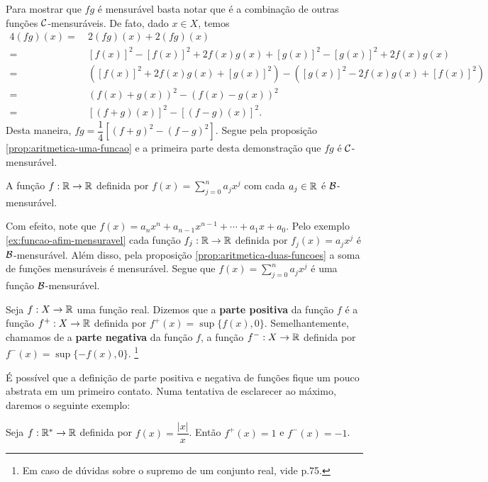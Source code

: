 \begin{prova}
    Para mostrar que $fg$ é mensurável basta notar que é a combinação de outras funções $\operatorname{\mathcal{C}}$-mensuráveis.
    De fato, dado $x \in X$, temos
	    \begin{align*}
	        4(fg)(x) 
	        =& \ 2(fg)(x) +  2(fg)(x)\\
	        =& \ [f(x)]^2 - [f(x)]^2 + 2f(x)g(x) + [g(x)]^2 - [g(x)]^2 + 2f(x)g(x)\\
	        =& \ \left([f(x)]^2 + 2f(x)g(x) + [g(x)]^2\right)  - \left([g(x)]^2 - 2f(x)g(x) + [f(x)]^2\right)\\
	        =& \ (f(x) +g(x))^2 - (f(x) - g(x))^2\\
	        =& \ [(f+g)(x)]^2 - [(f-g)(x)]^2.
	    \end{align*}
    Desta maneira, $fg = \dfrac{1}{4}\left[(f+g)^2 - (f-g)^2\right]$. Segue pela proposição \ref{prop:aritmetica-uma-funcao} e a primeira parte desta demonstração que $fg$ é $\operatorname{\mathcal{C}}$-mensurável.
\end{prova}

\begin{example}
\label{ex:funcao-polinomial-mensuravel}
    A função  $f:\mathbb{R} \to \mathbb{R}$ definida por $f(x) = \displaystyle \sum_{j = 0}^n a_jx^j$ com cada $a_j \in \mathbb{R}$ é $\operatorname{\mathcal{B}}$-mensurável.
\end{example}
   
    Com efeito, note que  $f(x) = a_nx^n + a_{n-1}x^{n-1} + \cdots + a_1x +a_0$.
	Pelo exemplo \ref{ex:funcao-afim-mensuravel} cada função $f_j:\mathbb{R} \to \mathbb{R}$ definida por  $f_j(x) = a_jx^j$ é $\operatorname{\mathcal{B}}$-mensurável.
	Além disso, pela proposição \ref{prop:aritmetica-duas-funcoes} a soma de funções mensuráveis é mensurável.
	Segue que $f(x) = \displaystyle\sum_{j = 0}^n a_jx^j$ é uma função $\operatorname{\mathcal{B}}$-mensurável.

\begin{definition}
	\label{def:parte-positiva e negativa}
    Seja $f: X \to \mathbb{R}$ uma função real. Dizemos que a \textbf{parte positiva} da função $f$ é a função $f^+: X \to \mathbb{R}$ definida por $f^+(x) = \sup\{f(x), 0\}$.
    Semelhantemente, chamamos de a \textbf{parte negativa} da função $f$, a função $f^-: X \to \mathbb{R}$ definida por $f^-(x) = \sup\{-f(x), 0\}$.
    \footnote{Em caso de dúvidas sobre o supremo de um conjunto real, vide \supercite{elon}{p.75}.}
\end{definition}

É possível  que a definição de parte positiva e negativa de funções fique um pouco abstrata em um primeiro contato. 
Numa tentativa de esclarecer ao máximo, daremos o seguinte exemplo:
\begin{example}
    Seja $f: \mathbb{R}^* \to \mathbb{R}$ definida por $f(x) =\dfrac{|x|}{x}$. 
    Então $f^+(x) = 1$ e $f^-(x) = -1$.
\end{example}

